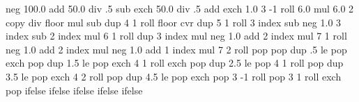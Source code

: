   {\pgfpoint{0bp}{0bp}}
  {\pgfpoint{100bp}{100bp}}{}{
  neg 100.0 add 50.0 div .5 sub  %
  exch 50.0 div .5 add exch %
  1.0 %
  3 -1 roll %
  6.0 mul %
  6.0 2 copy div floor mul sub %
  dup 4 1 roll %
  floor cvr %
  dup 5 1 roll %
  3 index sub neg %
  1.0 3 index sub %
  2 index mul %
  6 1 roll %
  dup 3 index mul neg 1.0 add %
  2 index mul %
  7 1 roll %
  neg 1.0 add %
  2 index mul neg 1.0 add %
  1 index mul %
  7 2 roll %
  pop pop %
  dup .5 le %
  {
    pop exch pop
  }
  { dup 1.5 le %
    {
      pop exch 4 1 roll exch pop
    }
    { dup 2.5 le %
      {
        pop 4 1 roll pop
      }
      { dup 3.5 le %
        {
          pop exch 4 2 roll pop
        }
        { dup 4.5 le %
          {
            pop exch pop 3 -1 roll
          }
          {
            pop 3 1 roll exch pop
          }
          ifelse
        }
        ifelse %
      }
      ifelse %
    }
    ifelse %
  }
  ifelse %
}

